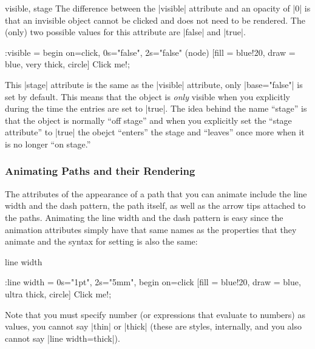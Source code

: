 \begin{tikzanimateattribute}{visible, stage}
  The difference between the |visible| attribute and an opacity of |0| is
  that an invisible object cannot be clicked and does not need to be
  rendered. The (only) two possible values for this attribute are
  |false| and |true|.

\begin{codeexample}[animation list={1,2,3,4}]
\tikz :visible = {begin on=click, 0s="false", 2s="false"}
  \node (node) [fill = blue!20, draw = blue, very thick, circle] {Click me!}; 
\end{codeexample}

  This |stage| attribute is the same as the |visible| attribute, only
  |base="false"| is set by default. This means that the object is
  \emph{only} visible when you explicitly during the time the entries
  are set to |true|. The idea behind the name ``stage'' is that the
  object is normally ``off stage'' and when you explicitly set the
  ``stage attribute'' to |true| the obejct ``enters'' the stage and
  ``leaves'' once more when it is no longer ``on stage.''
  
\begin{codeexample}[animation list={-1,0,1,2,3},animation bb={(1.3,-0.7) rectangle (2.7,0.7)}]
\end{codeexample}
\end{tikzanimateattribute}




\subsubsection{Animating Paths and their Rendering}
\label{section-animation-paths}

The attributes of the appearance of a path that you can animate
include the line width and the dash pattern, the path itself, as well
as the arrow tips attached to the paths. Animating the line width and
the dash pattern is easy since the animation attributes simply have
that same names as the properties that they animate and the syntax for
setting is also the same: 

\begin{tikzanimateattribute}{line width}
\begin{codeexample}[animation list={0.5,1,1.5,2}]
\tikz \node :line width = { 0s="1pt", 2s="5mm", begin on=click}
  [fill = blue!20, draw = blue, ultra thick, circle] {Click me!}; 
\end{codeexample}
  Note that you must specify number (or expressions that evaluate to
  numbers) as values, you cannot say |thin| or |thick| (these are
  styles, internally, and you also cannot say |line width=thick|).
\end{tikzanimateattribute}

